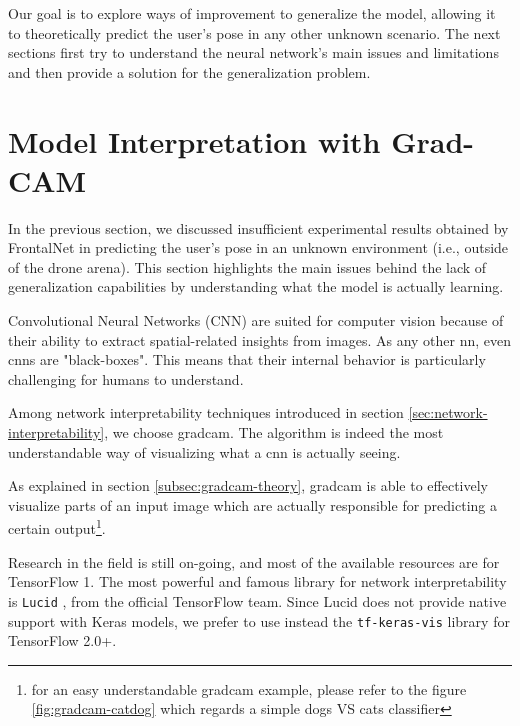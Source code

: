 \medskip

Our goal is to explore ways of improvement to generalize the model, allowing it to theoretically predict the user's pose in any other unknown scenario. The next sections first try to understand the neural network's main issues and limitations and then provide a solution for the generalization problem.




\section{Model Interpretation with Grad-CAM}
\label{sec:model-interpretration}


In the previous section, we discussed insufficient experimental results obtained by FrontalNet in predicting the user's pose in an unknown environment (i.e., outside of the drone arena). This section highlights the main issues behind the lack of generalization capabilities by understanding what the model is actually learning.

\medskip

Convolutional Neural Networks (CNN) are suited for computer vision because of their ability to extract spatial-related insights from images. As any other \gls{nn}, even \gls{cnn}s are "black-boxes". This means that their internal behavior is particularly challenging for humans to understand.

Among network interpretability techniques introduced in section \ref{sec:network-interpretability}, we choose \gls{gradcam}. The algorithm is indeed the most understandable way of visualizing what a \gls{cnn} is actually seeing.

As explained in section \ref{subsec:gradcam-theory}, \gls{gradcam} is able to effectively visualize parts of an input image which are actually responsible for predicting a certain output\footnote{for an easy understandable \gls{gradcam} example, please refer to the figure \ref{fig:gradcam-catdog} which regards a simple dogs VS cats classifier}.

\medskip

Research in the field is still on-going, and most of the available resources are for TensorFlow 1. The most powerful and famous library for network interpretability is \texttt{Lucid} \cite{tf-lucid}, from the official TensorFlow team. Since Lucid does not provide native support with Keras models, we prefer to use instead the \texttt{tf-keras-vis} library \cite{tf-keras-vis} for TensorFlow 2.0+.



